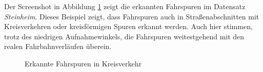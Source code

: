 Der Screenshot in Abbildung \ref{fig:results_lanes3} zeigt die erkannten Fahrspuren im Datensatz \textit{Steinheim}.
Dieses Beispiel zeigt, dass Fahrspuren auch in Straßenabschnitten mit Kreisverkehren oder kreisförmigen Spuren
erkannt werden. Auch hier stimmen, trotz des niedrigen Aufnahmewinkels, die Fahrspuren weitestgehend
mit den realen Fahrbahnverläufen überein.


\begin{figure}[H]
    \centering
    \caption{Erkannte Fahrspuren in Kreisverkehr}
    \label{fig:results_lanes3}
\end{figure}

